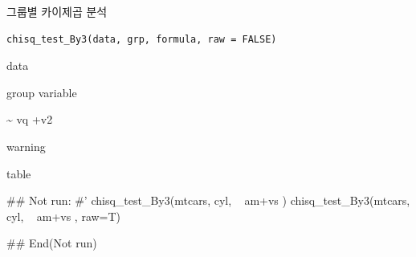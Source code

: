 \documentclass[a4paper]{book}
\begin{document}
%
\begin{Description}
그룹별 카이제곱 분석
\end{Description}
%
\begin{Usage}
\begin{verbatim}
chisq_test_By3(data, grp, formula, raw = FALSE)
\end{verbatim}
\end{Usage}
%
\begin{Arguments}
\begin{ldescription}
\item[\code{data}] data

\item[\code{grp}] group variable

\item[\code{formula}] \textasciitilde{} vq +v2

\item[\code{raw}] warning
\end{ldescription}
\end{Arguments}
%
\begin{Value}
table
\end{Value}
%
\begin{Examples}
\begin{ExampleCode}

\#\# Not run: 
#'
chisq_test_By3(mtcars, cyl, ~ am+vs )
chisq_test_By3(mtcars, cyl, ~ am+vs , raw=T)


## End(Not run)
\end{ExampleCode}
\end{Examples}
\end{document}
